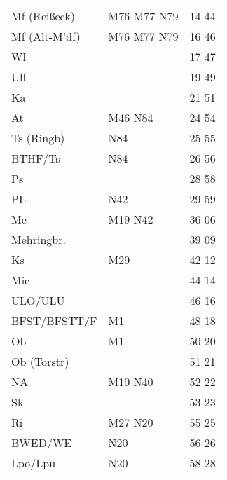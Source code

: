 \begin{tabular}{!{\color{schiefergrau}\vrule width 3pt}*{3}{l!{\color{schiefergrau}\vrule width 3pt}}}
\hline
{}
 \\
\hline
Mf (Reißeck) & \mbus{} M76 M77 \nbus{} N79         & 14 44 \\
Mf (Alt-M'df)& \mbus{} M76 M77 \nbus{} N79         & 16 46 \\
Wl           &                                     & 17 47 \\
Ull          &                                     & 19 49 \\
Ka           &                                     & 21 51 \\
At           & \mbus{} M46 \nbus{} N84             & 24 54 \\
Ts (Ringb)   & \nbus{} N84                         & 25 55 \\
BTHF/Ts      & \nbus{} N84                         & 26 56 \\
Ps           &                                     & 28 58 \\
PL           & \nbus{} N42                         & 29 59 \\
Me           & \nusieben{} \mbus{} M19 \nbus{} N42 & 36 06 \\
Mehringbr.   & \nueins{}                           & 39 09 \\
Ks           & \mbus{} M29                         & 42 12 \\
Mic          & \nuzwei{}                           & 44 14 \\
ULO/ULU      &                                     & 46 16 \\
BFST/BFSTT/F & \mtram{} M1                         & 48 18 \\
Ob           & \mtram{} M1                         & 50 20 \\
Ob (Torstr)  &                                     & 51 21 \\
NA           & \mtram{} M10 \nbus{} N40            & 52 22 \\
Sk           &                                     & 53 23 \\
Ri           & \mbus{} M27 \nbus{} N20             & 55 25 \\
BWED/WE      & \nbus{} N20                         & 56 26 \\
Lpo/Lpu      & \nuneun{} \nbus{} N20               & 58 28 \\

\end{tabular}

